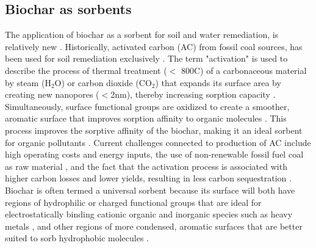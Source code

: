 \subsection{Biochar as sorbents}
The application of biochar as a sorbent for soil and water remediation, is relatively new \citep{beesley2011review}. Historically, activated carbon (\acrshort{AC}) from fossil coal sources, has been used for soil remediation exclusively \citep{hagemann2018activated}. The term "activation" is used to describe the process of thermal treatment ($<$ 800\textdegree C) of a carbonaceous material by steam ($\mathrm{H_2O}$) or carbon dioxide ($\mathrm{CO_2}$) that expands its surface area by creating new nanopores ($<$2nm), thereby increasing sorption capacity \citep{LehmannAndJoseph2015}. Simultaneously, surface functional groups are oxidized to create a smoother, aromatic surface that improves sorption affinity to organic molecules \citep{sajjadi2019comprehensive}. This process improves the sorptive affinity of the biochar, making it an ideal sorbent for organic pollutants \citep{Ahmad2014}. Current challenges connected to production of AC include high operating costs and energy inputs, the use of non-renewable fossil fuel coal as raw material \citep{Li2019}, and the fact that the activation process is associated with higher carbon losses and lower yields, resulting in less carbon sequestration \citep{Sormo2021}. Biochar is often termed a universal sorbent because its surface will both have regions of hydrophilic or charged functional groups that are ideal for electrostatically binding cationic organic and inorganic species such as heavy metals \citep{silvani2019can,zhang2013sorption}, and other regions of more condensed, aromatic surfaces that are better suited to sorb hydrophobic molecules \citep{Cornelissen2005}.

